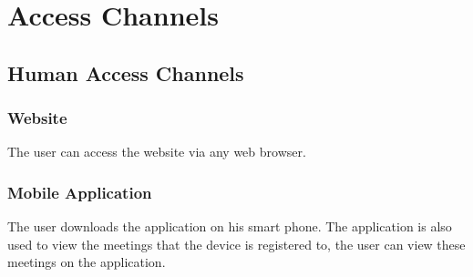 \section{Access Channels}
\subsection{Human Access Channels}
    \subsubsection{Website}
    The user can access the website via any web browser. 
    \subsubsection{Mobile Application}
    The user downloads the application on his smart phone. The application is also used to view the meetings that the device is registered to, the user can view these meetings on the application.

